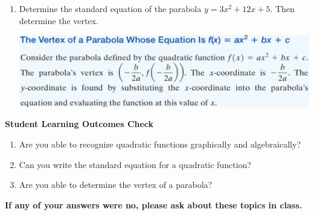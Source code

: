 \begin{enumerate}
 
 \item Determine the standard equation of the parabola $y=3x^2+12x+5$.  Then determine the vertex.
 
 
 \vfill
 
  
 \includegraphics[scale=.75]{parabola}






\end{enumerate}

\noindent \textbf{Student Learning Outcomes Check}

\begin{enumerate}
\item Are you able to recognize quadratic functions graphically and algebraically?
\item Can you write the standard equation for a quadratic function?
\item Are you able to determine the vertex of a parabola?


\end{enumerate}

\noindent \textbf{If any of your answers were no, please ask about these topics in class.}


